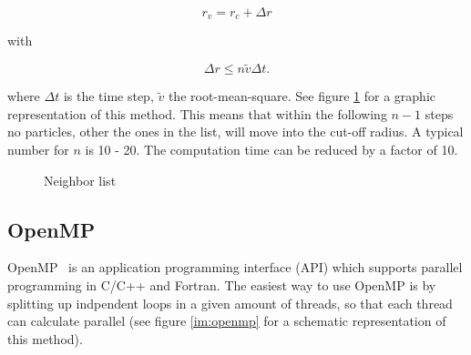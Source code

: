 \documentclass[a4paper]{article}
\begin{document}
\begin{equation}
r_v = r_c + \Delta r
\label{eq:neigbor1}
\end{equation}

with

\begin{equation}
\Delta r \leq n \tilde{v} \Delta t.
\label{eq:neighbor2}
\end{equation}

where $\Delta t$ is the time step, $\tilde{v}$ the root-mean-square. See figure \ref{im:neighbor_list} for a graphic representation of this method. This means that within the following $n-1$ steps no particles, other the ones in the list, will move into the cut-off radius. A typical number for $n$ is 10 - 20. The computation time can be reduced by a factor of 10.

\begin{figure}[H]
\centering
{}
\label{im:neighbor_list}
\caption{Neighbor list}
\end{figure}

\subsection{OpenMP}

OpenMP~\cite{OpenMP} is an application programming interface (API) which supports parallel programming in C/C++ and Fortran. The easiest way to use OpenMP is by splitting up indpendent loops in a given amount of threads, so that each thread can calculate parallel (see figure \ref{im:openmp} for a schematic representation of this method). 
\end{document}
